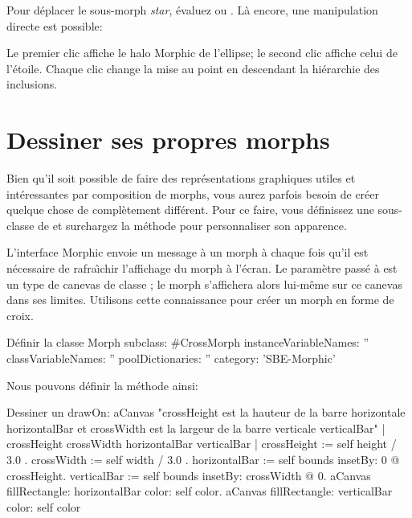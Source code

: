 \documentclass[a4paper,10pt,twoside]{book}
\begin{document}
Pour d\'eplacer le sous-morph \emph{star}, \'evaluez 
  ou 
. L\`a encore, une manipulation directe est
possible: 


\noindent
Le premier clic affiche le halo Morphic de l'ellipse; le second clic
affiche celui de l'\'etoile. Chaque clic change la mise au point en
descendant la hi\'erarchie des inclusions.


\section{Dessiner ses propres morphs}

Bien qu'il soit possible de faire des repr\'esentations graphiques
utiles et int\'eressantes par composition de morphs, vous aurez
parfois besoin de cr\'eer quelque chose de compl\`etement diff\'erent.
Pour ce faire, vous d\'efinissez une sous-classe de  et
surchargez la m\'ethode  pour personnaliser son
apparence.

L'interface Morphic envoie un message  \`a un morph \`a
chaque fois qu'il est n\'ecessaire de rafra\^{\i}chir l'affichage du
morph \`a l'\'ecran. Le param\`etre pass\'e \`a  est un
type de canevas de classe ; le morph s'affichera alors
lui-m\^eme sur ce canevas dans ses limites. %
Utilisons cette connaissance pour cr\'eer un morph en forme de croix.

\begin{classdef}{D\'efinir la classe }
Morph subclass: #CrossMorph
	instanceVariableNames: ''
	classVariableNames: ''
	poolDictionaries: ''
	category: 'SBE-Morphic'
\end{classdef}

Nous pouvons d\'efinir la m\'ethode  ainsi:
\begin{method}[firstDrawOn]{Dessiner un }
drawOn: aCanvas 
	"crossHeight est la hauteur de la barre horizontale horizontalBar
    et crossWidth est la largeur de la barre verticale verticalBar"
    | crossHeight crossWidth horizontalBar verticalBar |
	crossHeight := self height / 3.0 .
	crossWidth := self width / 3.0 .
	horizontalBar := self bounds insetBy: 0 @ crossHeight.
	verticalBar := self bounds insetBy: crossWidth @ 0.
	aCanvas fillRectangle: horizontalBar color: self color.
	aCanvas fillRectangle: verticalBar color: self color
\end{method}
\end{document}
